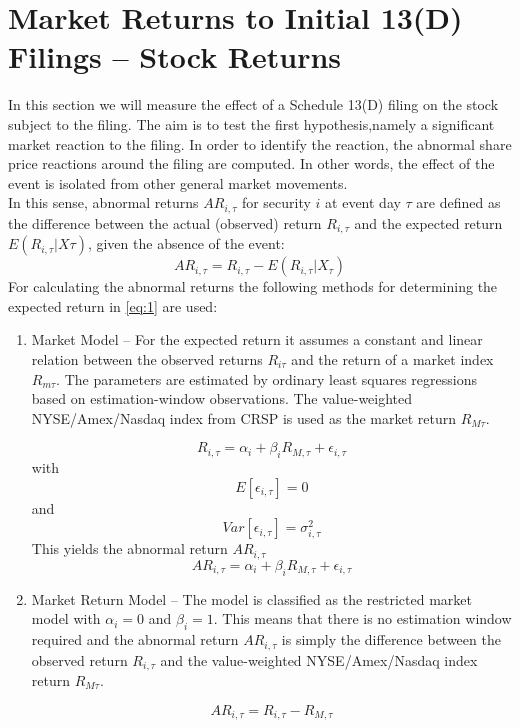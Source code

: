 \documentclass[12pt]{article}
\begin{document}
\section{Market Returns to Initial 13(D) Filings -- Stock Returns}
In this section we will measure the effect of a Schedule 13(D) filing on the stock subject to the filing. The aim is to test the first hypothesis,namely a significant market reaction to the filing. In order to identify the reaction, the abnormal share price reactions around the filing are computed. In other words, the effect of the event is isolated from other general market movements.\\
In this sense, abnormal returns $AR_{i,\tau}$ for security $i$ at event day $\tau$ are defined as the difference between the actual (observed) return $R_{i,\tau}$ and the expected return $E(R_{i,\tau}|X{\tau})$, given the absence of the event:
	\begin{equation}\label{eq:1}
		AR_{i,\tau}=R_{i,\tau}-E(R_{i,\tau}|X_{\tau})
	\end{equation}
For calculating the abnormal returns the following methods for determining the expected return in \eqref{eq:1} are used: 
\begin{enumerate}
	\item Market Model -- For the expected return it assumes a constant and linear relation between the observed returns $R_{i\tau}$ and the return of a market index $R_{m\tau}$. The parameters are estimated by ordinary least squares regressions based on estimation-window observations. The value-weighted NYSE/Amex/Nasdaq index from CRSP is used as the market return $R_{M\tau}$.

		\begin{equation}\label{eq:2}
			R_{i,\tau}=\alpha_{i}+\beta_{i}R_{M,\tau}+\epsilon_{i,\tau}
		\end{equation}
		with 
		\begin{equation}\label{eq:3}
			E[\epsilon_{i,\tau}]=0
		\end{equation}
		and 
		\begin{equation}\label{eq:4}
			Var[\epsilon_{i,\tau}]=\sigma^2_{i,\tau}
		\end{equation}
		This yields the abnormal return $AR_{i,\tau}$
		\begin{equation}\label{eq:5}
			AR_{i,\tau}=\alpha_{i}+\beta_{i}R_{M,\tau}+\epsilon_{i,\tau}
		\end{equation}
		
	\item Market Return Model -- The model is classified as the restricted market model with $\alpha_{i}=0$ and $\beta_{i}=1$. This means that there is no estimation window required and the abnormal return $AR_{i,\tau}$ is simply the difference between the observed return $R_{i,\tau}$ and the value-weighted NYSE/Amex/Nasdaq index return $R_{M\tau}$.

		\begin{equation}\label{eq:6}
			AR_{i,\tau}=R_{i,\tau}-R_{M,\tau}
		\end{equation}

\end{enumerate}
\end{document}

